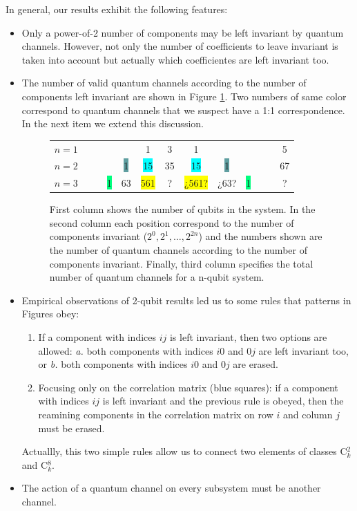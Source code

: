 \documentclass[11pt,dvipsnames]{article} %
\begin{document}
In general, our results exhibit the following features:
\begin{itemize}
\item Only a power-of-2 number of components may be left invariant by 
			quantum channels. However,
			not only the number of 
			coefficients to leave invariant is taken into account but actually
			which coefficientes are left invariant too.

\item 
The number of valid quantum channels according to the number of components
left invariant are shown in Figure \ref{fig:CCs-by-components}. Two numbers
of same color correspond to quantum channels that we suspect have a 1:1 
correspondence. In the next item we extend this discussion.

\begin{figure}[H]
	\centering
		\begin{tabular}{>{$n=}l<{$\hfill}*{12}{c}}
			1 &&&&&\colorbox{Apricot}{1}&3&\colorbox{Apricot}{1}&&&&&5\\
			2 &&&&\colorbox{CadetBlue}{1}&\colorbox{Cyan}{15}&35&\colorbox{Cyan}{15}&\colorbox{CadetBlue}{1}&&&&67\\
			3 &&&\colorbox{SpringGreen}{1}&\colorbox{RedOrange}{63}&\colorbox{Yellow}{561}&?&\colorbox{Yellow}{¿561?}&
				\colorbox{RedOrange}{¿63?}&\colorbox{SpringGreen}{1}&&&?
			\end{tabular}
			\caption{First column shows the number of qubits in the system. 
							In the second column each position correspond to the 
							number of components invariant ($2^0, 2^1, \ldots, 2^{2n}$) and
							the numbers shown are the number of quantum channels according to 
							the number of components invariant.
							Finally, third column specifies the total number of quantum 
							channels for a n-qubit system.}
			\label{fig:CCs-by-components}
\end{figure}

\item Empirical observations of 2-qubit results led us to some rules that 
			patterns in Figures obey:
			\begin{enumerate}
				\item If a component with indices $ij$ is left invariant, then two 
							options are allowed: \textit{a.} both components with indices $i0$ 
							and $0j$ are left invariant too, or \textit{b.} both
							components with indices $i0$ and $0j$ are erased.
				\item Focusing only on the correlation matrix (blue squares): if a 
							component	with indices $ij$ is left invariant and the previous 
							rule is obeyed, then the reamining components in the correlation 
							matrix on row $i$ and column $j$ must be erased.
			\end{enumerate}	Actuallly, this two simple rules allow us to connect
			two elements of classes C${}^2_k$ and C${}^8_k$.

	\item The action of a quantum channel on every subsystem must be another
				channel.

\end{itemize}
\end{document}
